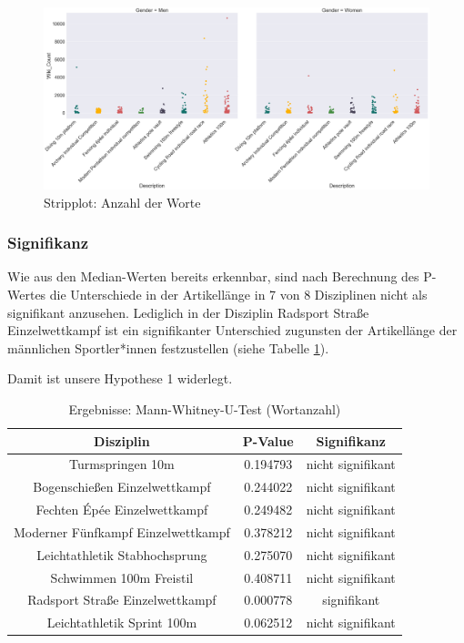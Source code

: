 \documentclass[11pt]{article}
\begin{document}
\begin{figure}
\includegraphics[width=1\textwidth]{figures/wordcount_stripplot.png}
\caption[Stripplot: Anzahl der Worte]{Stripplot: Anzahl der Worte}
\label{fig:wordcountStripPlot}
\end{figure}

\subsubsection {Signifikanz}
Wie aus den Median-Werten bereits erkennbar, sind nach Berechnung des P-Wertes die Unterschiede in der Artikellänge in 7 von 8 Disziplinen nicht als signifikant anzusehen. Lediglich in der Disziplin Radsport Straße Einzelwettkampf ist ein signifikanter Unterschied zugunsten der Artikellänge der männlichen Sportler*innen festzustellen (siehe Tabelle \ref{tab:utest_wordcount}).

Damit ist unsere Hypothese 1 widerlegt.

\begin{table}
\centering
\begin{tabular}{ c|c|c }
  Disziplin & P-Value & Signifikanz \\
  \hline
  Turmspringen 10m & 0.194793 & nicht signifikant \\
  Bogenschießen Einzelwettkampf & 0.244022 & nicht signifikant \\
  Fechten Épée Einzelwettkampf & 0.249482 & nicht signifikant \\
  Moderner Fünfkampf Einzelwettkampf & 0.378212 & nicht signifikant \\
  Leichtathletik Stabhochsprung & 0.275070 & nicht signifikant \\
  Schwimmen 100m Freistil & 0.408711 & nicht signifikant \\
  Radsport Straße Einzelwettkampf & 0.000778 & signifikant \\
  Leichtathletik Sprint 100m & 0.062512 & nicht signifikant \\
\end{tabular}
\caption{\label{tab:utest_wordcount}Ergebnisse: Mann-Whitney-U-Test (Wortanzahl)}
\end{table}
\end{document}
